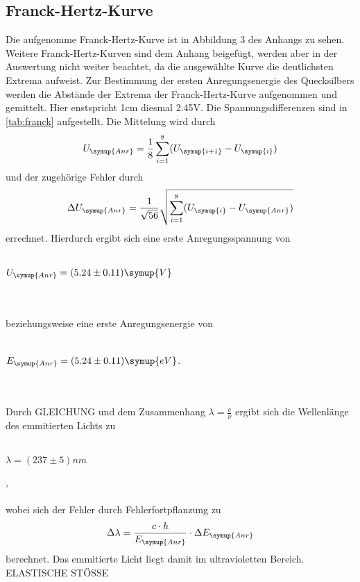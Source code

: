     \subsection{Franck-Hertz-Kurve} 
    Die aufgenomme Franck-Hertz-Kurve ist in Abbildung 3 des Anhangs zu sehen. 
    Weitere Franck-Hertz-Kurven sind dem Anhang beigefügt, werden aber in der Auswertung nicht weiter beachtet,
    da die ausgewählte Kurve die deutlichsten Extrema aufweist. Zur Bestimmung der ersten Anregungsenergie des Quecksilbers
    werden die Abstände der Extrema der Franck-Hertz-Kurve aufgenommen und gemittelt. Hier enstspricht 1cm diesmal 2.45V. Die Spannungsdifferenzen
    sind in \autoref{tab:franck} aufgestellt. Die Mittelung wird durch
    \begin{equation}
      U_{\symup{Anr}} = \frac{1}{8} \sum_{i = 1}^{8} (U_{\symup{i+1}} - U_{\symup{i}})
    \end{equation}  
    und der zugehörige Fehler durch 
    \begin{equation}
      \Delta U_{\symup{Anr}} = \frac{1}{\sqrt{56}} \sqrt{ \sum_{i = 1}^{8} (U_{\symup{i}} - U_{\symup{Anr}}) }
    \end{equation}
    errechnet. Hierdurch ergibt sich eine erste Anregungsspannung von 
    \\ \\
    \centerline{$U_{\symup{Anr}} = (5.24 \pm 0.11) \symup{V}$}
    \\ \\
    beziehungsweise eine erste Anregungsenergie von
    \\ \\
    \centerline{$E_{\symup{Anr}} = (5.24 \pm 0.11) \symup{eV}$.}
    \\ \\  
    Durch GLEICHUNG und dem Zusammenhang $\lambda = \frac{c}{\nu}$ ergibt sich die Wellenlänge des emmitierten Lichts zu
    \\ \\
    \centerline{$\lambda = (237 \pm 5) nm$},
    \\ \\
    wobei sich der Fehler durch Fehlerfortpflanzung zu
    \begin{equation}
      \Delta \lambda = \frac{c \cdot h}{E_{\symup{Anr}}} \cdot \Delta E_{\symup{Anr}}
    \end{equation}
    berechnet. Das emmitierte Licht liegt damit im ultravioletten Bereich. 
    ELASTISCHE STÖSSE

    



